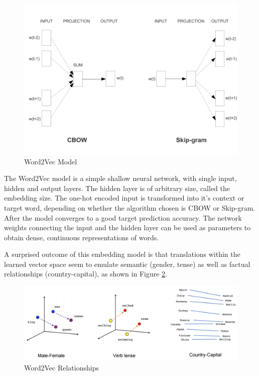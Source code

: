 \begin{figure}[ht]
	\centering
	\includegraphics[width=\textwidth]{images/efficient-models}
	\caption{\label{fig:efficient-models} Word2Vec Model}
\end{figure}

The Word2Vec model is a simple shallow neural network, with single input, hidden and output layers. The hidden layer is of arbitrary size, called the embedding size. The one-hot encoded input is transformed into it's context or target word, depending on whether the algorithm chosen is CBOW or Skip-gram. After the model converges to a good target prediction accuracy. The network weights connecting the input and the hidden layer can be used as parameters to obtain dense, continuous representations of words.

A surprised outcome of this embedding model is that translations within the learned vector space seem to emulate semantic (gender, tense) as well as factual relationships (country-capital), as shown in Figure \ref{fig:word2vec-linear-relationships}.

\begin{figure}[ht]
	\centering
	\includegraphics[width=\textwidth]{images/word2vec-linear-relationships}
	\caption{\label{fig:word2vec-linear-relationships} Word2Vec Relationships}
\end{figure}


